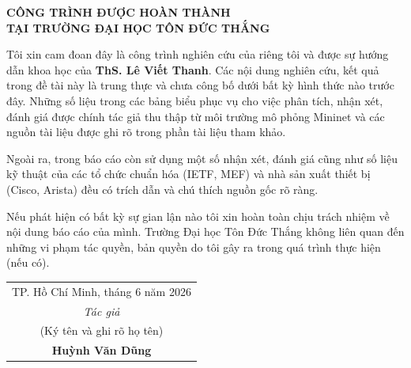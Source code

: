 \begin{center}
\pagestyle{empty}
{\Large \textbf{CÔNG TRÌNH ĐƯỢC HOÀN THÀNH}}\\
\vspace{0.5cm}
{\Large \textbf{TẠI TRƯỜNG ĐẠI HỌC TÔN ĐỨC THẮNG}}
\end{center}

\vspace{1cm}

Tôi xin cam đoan đây là công trình nghiên cứu của riêng tôi và được sự hướng dẫn khoa học của \textbf{ThS. Lê Viết Thanh}. Các nội dung nghiên cứu, kết quả trong đề tài này là trung thực và chưa công bố dưới bất kỳ hình thức nào trước đây. Những số liệu trong các bảng biểu phục vụ cho việc phân tích, nhận xét, đánh giá được chính tác giả thu thập từ môi trường mô phỏng Mininet và các nguồn tài liệu được ghi rõ trong phần tài liệu tham khảo.

\vspace{0.5cm}
Ngoài ra, trong báo cáo còn sử dụng một số nhận xét, đánh giá cũng như số liệu kỹ thuật của các tổ chức chuẩn hóa (IETF, MEF) và nhà sản xuất thiết bị (Cisco, Arista) đều có trích dẫn và chú thích nguồn gốc rõ ràng.

\vspace{0.5cm}
Nếu phát hiện có bất kỳ sự gian lận nào tôi xin hoàn toàn chịu trách nhiệm về nội dung báo cáo của mình. Trường Đại học Tôn Đức Thắng không liên quan đến những vi phạm tác quyền, bản quyền do tôi gây ra trong quá trình thực hiện (nếu có).

\vspace{2cm}

\begin{flushright}
\begin{tabular}{c}
    \multicolumn{1}{r}{TP. Hồ Chí Minh, tháng 6 năm 2026}\\[0.5cm]
    \textit{Tác giả} \\
    (Ký tên và ghi rõ họ tên) \\[2cm]
    \textbf{Huỳnh Văn Dũng} \\
\end{tabular}
\end{flushright}